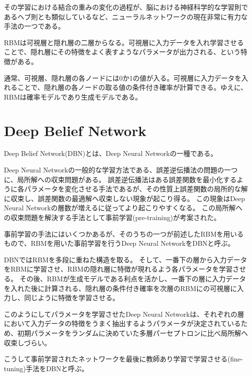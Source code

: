その学習における結合の重みの変化の過程が、脳における神経科学的な学習則であるヘブ則とも類似しているなど、ニューラルネットワークの現在非常に有力な手法の一つである。

RBMは可視層と隠れ層の二層からなる。可視層に入力データを入れ学習させることで、隠れ層にその特徴をよく表すようなパラメータが出力される、という特徴がある。

通常、可視層、隠れ層の各ノードには0か1の値が入る。可視層に入力データを入れることで、隠れ層の各ノードの取る値の条件付き確率が計算できる。ゆえに、RBMは確率モデルであり生成モデルである。

\section{Deep Belief Network}
Deep Belief Network(DBN)とは、Deep Neural Networkの一種である。

Deep Neural Networkの一般的な学習方法である、誤差逆伝播法の問題の一つに、局所解への収束問題がある。
誤差逆伝播法はある誤差関数を最小化するように各パラメータを変化させる手法であるが、その性質上誤差関数の局所的な解に収束し、誤差関数の最適解へ収束しない現象が起こり得る。
この現象はDeep Neural Networkの層数が増えるに従ってより起こりやすくなる。
この局所解への収束問題を解決する手法として事前学習(pre-training)が考案された。

事前学習の手法にはいくつかあるが、そのうちの一つが前述したRBMを用いるもので、RBMを用いた事前学習を行うDeep Neural NetworkをDBNと呼ぶ。

DBNではRBMを多段に重ねた構造を取る。
そして、一番下の層から入力データをRBMに学習させ、RBMの隠れ層に特徴が現れるよう各パラメータを学習させる。
その後、RBMが生成モデルである利点を活かし、一番下の層に入力データを入れた後に計算される、隠れ層の条件付き確率を次層のRBMにの可視層に入力し、同じように特徴を学習させる。

このようにしてパラメータを学習させたDeep Neural Networkは、それぞれの層において入力データの特徴をうまく抽出するようパラメータが決定されているため、初期パラメータをランダムに決めていた多層パーセプトロンに比べ局所解へ収束しづらい。

こうして事前学習されたネットワークを最後に教師あり学習で学習させる(fine-tuning)手法をDBNと呼ぶ。


